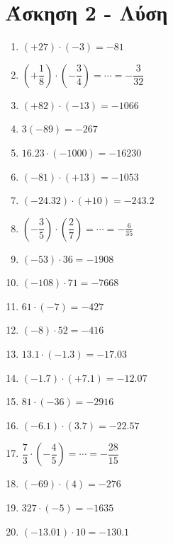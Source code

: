 \documentclass[a4paper,10pt]{report}
\begin{document}
\section*{Άσκηση 2 - Λύση \hfill \small{}}
\begin{multicols}{2}
\begin{enumerate}[1)]
 \item $(+27)\cdot(-3)=-81$
 \item $(+\dfrac{1}{8})\cdot(-\dfrac{3}{4})=\cdots=-\dfrac{3}{32}$
 \item $(+82)\cdot(-13)=-1066$
 \item $3(-89)=-267$
 \item $16.23\cdot(-1000)=-16230$
 \item $(-81)\cdot(+13)=-1053$
 \item $(-24.32)\cdot(+10)=-243.2$
 \item $(-\dfrac{3}{5})\cdot(\dfrac{2}{7})=\cdots=-\frac{6}{35}$
 \item $(-53)\cdot36=-1908$
 \item $(-108)\cdot71=-7668$
 \item $61\cdot(-7)=-427$
 \item $(-8)\cdot52=-416$
 \item $13.1\cdot(-1.3)=-17.03$
 \item $(-1.7)\cdot(+7.1)=-12.07$
 \item $81\cdot(-36)=-2916$
 \item $(-6.1)\cdot(3.7)=-22.57$
 \item $\dfrac{7}{3}\cdot(-\dfrac{4}{5})=\cdots=-\dfrac{28}{15}$
 \item $(-69)\cdot(4)=-276$
 \item $327\cdot(-5)=-1635$
 \item $(-13.01)\cdot10=-130.1$
\end{enumerate}
\end{multicols}






\end{document}
